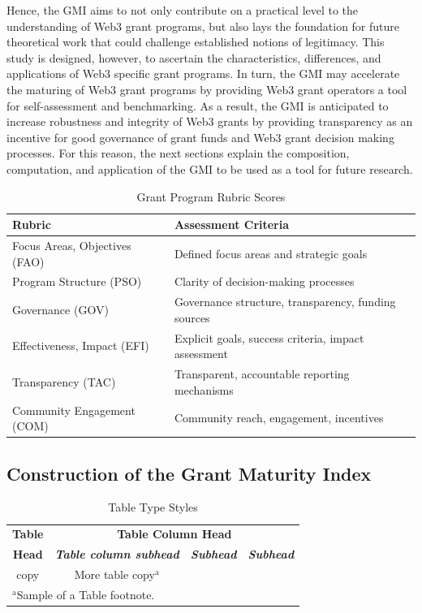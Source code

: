 \documentclass[conference]{IEEEtran}
\begin{document}
Hence, the GMI aims to not only contribute on a practical level to the understanding of Web3 grant programs, but also lays the foundation for future theoretical work that could challenge established notions of legitimacy. This study is designed, however, to ascertain the characteristics, differences, and applications of Web3 specific grant programs. In turn, the GMI may accelerate the maturing of Web3 grant programs by providing Web3 grant operators a tool for self-assessment and benchmarking. As a result, the GMI is anticipated to increase robustness and integrity of Web3 grants by providing transparency as an incentive for good governance of grant funds and Web3 grant decision making processes. For this reason, the next sections explain the composition, computation, and application of the GMI to be used as a tool for future research.

\begin{table}[htbp]
\caption{Grant Program Rubric Scores}
\footnotesize
\begin{tabular}{p{3.8cm}p{4.5cm}}
\hline
\textbf{Rubric} & \textbf{Assessment Criteria} \\
\hline
Focus Areas, Objectives (FAO) & Defined focus areas and strategic goals \\
\hline
Program Structure (PSO) & Clarity of decision-making processes \\
\hline
Governance (GOV) & Governance structure, transparency, funding sources \\
\hline
Effectiveness, Impact (EFI) & Explicit goals, success criteria, impact assessment \\
\hline
Transparency (TAC) & Transparent, accountable reporting mechanisms \\
\hline
Community Engagement (COM) & Community reach, engagement, incentives \\
\hline
\end{tabular}
\label{tab:grant_rubric}
\end{table}


\subsection{Construction of the Grant Maturity Index}






\begin{table}[htbp]
\caption{Table Type Styles}
\begin{center}
\begin{tabular}{|c|c|c|c|}
\hline
\textbf{Table}&\multicolumn{3}{|c|}{\textbf{Table Column Head}} \\
\cline{2-4} 
\textbf{Head} & \textbf{\textit{Table column subhead}}& \textbf{\textit{Subhead}}& \textbf{\textit{Subhead}} \\
\hline
copy& More table copy$^{\mathrm{a}}$& &  \\
\hline
\multicolumn{4}{l}{$^{\mathrm{a}}$Sample of a Table footnote.}
\end{tabular}
\label{tab1}
\end{center}
\end{table}
\end{document}
